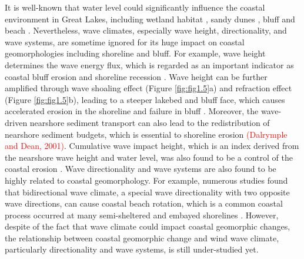 It is well-known that water level could significantly influence the coastal environment in Great Lakes, including wetland habitat \citep{hohman_influence_2021,anderson_influence_2023}, sandy dunes \citep{arbogast_maximum-limiting_1999,kilibarda_70year_2015}, bluff \citep{volpano_three-dimensional_2020} and beach \citep{scholle_responses_2022}.  Nevertheless, wave climates, especially wave height, directionality, and wave systems, are sometime ignored for its huge impact on coastal geomorphologies including shoreline and bluff. For example, wave height determines the wave energy flux, which is regarded as an important indicator as coastal bluff erosion and shoreline recession \citep{benumof_relationship_2000,galal_influence_2011}. Wave height can be further amplified through wave shoaling effect (Figure \ref{fig:fig1.5}a) and refraction effect (Figure \ref{fig:fig1.5}b), leading to a steeper lakebed and bluff face, which causes accelerated erosion in the shoreline and failure in bluff \citep{booth_wave_1994}. Moreover, the wave-driven nearshore sediment transport can also lead to the redistribution of nearshore sediment budgets, which is essential to shoreline erosion \citep{amin_statistical_1997,usace_cem_2002,adams_effects_2011} \textcolor{red}{(Dalrymple and Dean, 2001)}. Cumulative wave impact height, which is an index derived from the nearshore wave height and water level, was also found to be a control of the coastal erosion \citep{ruggiero_wave_2001,swenson_bluff_2006}. Wave directionality and wave systems are also found to be highly related to coastal geomorphology. For example, numerous studies found that bidirectional wave climate, a special wave directionality with two opposite wave directions, can cause coastal beach rotation, which is a common coastal process occurred at many semi-sheltered and embayed shorelines \citep{klein_short-term_2002,wiggins_coastal_2019,wiggins_regionally-coherent_2019,loureiro_24_2020}. However, despite of the fact that wave climate could impact coastal geomorphic changes, the relationship between coastal geomorphic change and wind wave climate, particularly directionality and wave systems, is still under-studied yet. 

